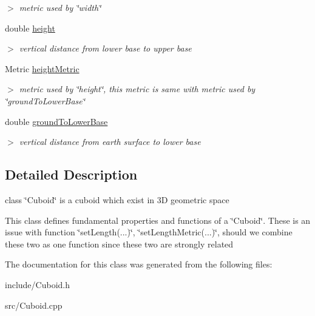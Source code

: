 \begin{DoxyCompactItemize}
\begin{DoxyCompactList}\small\item\em $>$ metric used by \char`\"{}width\char`\"{} \end{DoxyCompactList}\item 
\hypertarget{classCuboid_aded3775fba282d4d1065cbf7cd20f569}{double \hyperlink{classCuboid_aded3775fba282d4d1065cbf7cd20f569}{height}}\label{classCuboid_aded3775fba282d4d1065cbf7cd20f569}

\begin{DoxyCompactList}\small\item\em $>$ vertical distance from lower base to upper base \end{DoxyCompactList}\item 
\hypertarget{classCuboid_a686ee4124225b3ccc6769104882f6672}{\-Metric \hyperlink{classCuboid_a686ee4124225b3ccc6769104882f6672}{height\-Metric}}\label{classCuboid_a686ee4124225b3ccc6769104882f6672}

\begin{DoxyCompactList}\small\item\em $>$ metric used by \char`\"{}height\char`\"{}, this metric is same with metric used by \char`\"{}ground\-To\-Lower\-Base\char`\"{} \end{DoxyCompactList}\item 
\hypertarget{classCuboid_afb9b133c1eb5f90fafbae84d4e4fe639}{double \hyperlink{classCuboid_afb9b133c1eb5f90fafbae84d4e4fe639}{ground\-To\-Lower\-Base}}\label{classCuboid_afb9b133c1eb5f90fafbae84d4e4fe639}

\begin{DoxyCompactList}\small\item\em $>$ vertical distance from earth surface to lower base \end{DoxyCompactList}\end{DoxyCompactItemize}


\subsection{\-Detailed \-Description}
class \char`\"{}\-Cuboid\char`\"{} is a cuboid which exist in 3\-D geometric space 

\-This class defines fundamental properties and functions of a \char`\"{}\-Cuboid\char`\"{}. \-These is an issue with function \char`\"{}set\-Length(...)\char`\"{}, \char`\"{}set\-Length\-Metric(...)\char`\"{}, should we combine these two as one function since these two are strongly related 

\-The documentation for this class was generated from the following files\-:\begin{DoxyCompactItemize}
\item 
include/\-Cuboid.\-h\item 
src/\-Cuboid.\-cpp\end{DoxyCompactItemize}
